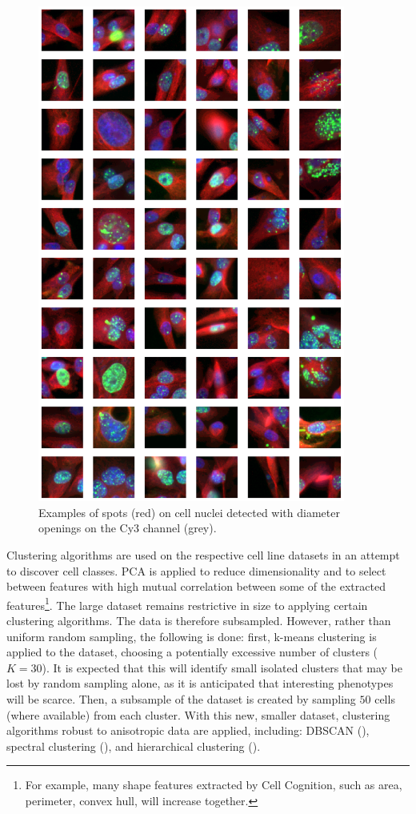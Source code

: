 \begin{figure}[ht!]
\centering
\includegraphics[width=0.9\textwidth]{img/samples.pdf}
\caption{Examples of spots (red) on cell nuclei detected with diameter openings on the Cy3 channel (grey).}
\label{fig:cell_crop_samples}
\end{figure}

Clustering algorithms are used on the respective cell line datasets in an attempt to discover cell classes. PCA is applied to reduce dimensionality and to select between features with high mutual correlation between some of the extracted features\footnote{For example, many shape features extracted by Cell Cognition, such as area, perimeter, convex hull, will increase together.}. The large dataset remains restrictive in size to applying certain clustering algorithms. The data is therefore subsampled. However, rather than uniform random sampling, the following is done: first, k-means clustering is applied to the dataset, choosing a potentially excessive number of clusters ($K = 30$). It is expected that this will identify small isolated clusters that may be lost by random sampling alone, as it is anticipated that interesting phenotypes will be scarce. Then, a subsample of the dataset is created by sampling $50$ cells (where available) from each cluster. With this new, smaller dataset, clustering algorithms robust to anisotropic data are applied, including: DBSCAN (\cite{ester1996density}), spectral clustering (\cite{von2007tutorial}), and hierarchical clustering (\cite{ward1963hierarchical}).

